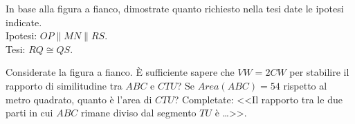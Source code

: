 \noindent\begin{minipage}{.5\textwidth}
\begin{esercizio}
\label{ese:6.90}
In base alla figura a fianco, dimostrate quanto richiesto 
nella tesi date le ipotesi indicate.\\
Ipotesi: $OP\parallel MN\parallel RS$.\\
Tesi: $RQ\cong QS$.
\end{esercizio}
\end{minipage}
\begin{minipage}{.5\textwidth}
\begin{inaccessibleblock}
 \begin{center}  \end{center}
\end{inaccessibleblock}
\end{minipage}

\noindent\begin{minipage}{.5\textwidth}
\begin{esercizio}
\label{ese:6.91}
Considerate la figura a fianco. È sufficiente sapere che 
$VW=2CW$ per stabilire il rapporto di similitudine tra $ABC$ e $CTU$? 
Se $Area(ABC) = 54$ rispetto al metro quadrato, quanto è l'area di 
$CTU$? Completate: <<Il rapporto tra le due parti in cui $ABC$ rimane 
diviso dal segmento $TU$ è \ldots{}>>.
\end{esercizio}
\end{minipage}
\begin{minipage}{.5\textwidth}
\begin{inaccessibleblock}
 \begin{center}  \end{center}
\end{inaccessibleblock}
\end{minipage}

